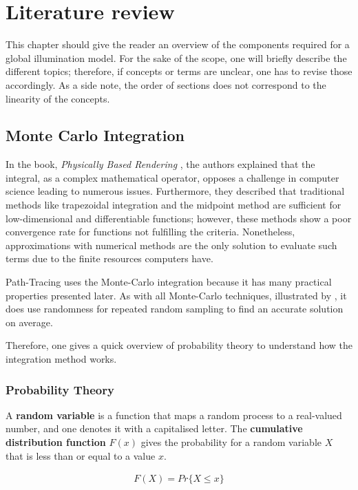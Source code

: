 \chapter{Literature review}

This chapter should give the reader an overview of the components required for a global illumination model.
For the sake of the scope, one will briefly describe the different topics; therefore, if concepts or terms are unclear, one has to revise those accordingly.
As a side note, the order of sections does not correspond to the linearity of the concepts.

\section{Monte Carlo Integration}

In the book, \textit{Physically Based Rendering} \cite{pharr_physically_2017}, the authors explained that the integral, as a complex mathematical operator, opposes a challenge in computer science leading to numerous issues. 
Furthermore, they described that traditional methods like trapezoidal integration and the midpoint method are sufficient for low-dimensional and differentiable functions; however, these methods show a poor convergence rate for functions not fulfilling the criteria.
Nonetheless, approximations with numerical methods are the only solution to evaluate such terms due to the finite resources computers have.

Path-Tracing uses the Monte-Carlo integration because it has many practical properties presented later.
As with all Monte-Carlo techniques, illustrated by \cite{kalos_monte_2008}, it does use randomness for repeated random sampling to find an accurate solution on average.

Therefore, one gives a quick overview of probability theory to understand how the integration method works.

\subsection{Probability Theory}

A \textbf{random variable} is a function that maps a random process to a real-valued number, and one denotes it with a capitalised letter.
The \textbf{cumulative distribution function} $F(x)$ gives the probability for a random variable $X$ that is less than or equal to a value $x$.

\begin{align*}
F(X)=Pr\{X\le x\}
\end{align*}

